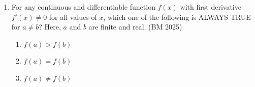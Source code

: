 \begin{enumerate}[label=\thesubsection.\arabic*, ref=\thesubsection.\theenumi]
\begin{center}


\end{center}
\begin{multicols}{4}
\begin{enumerate}
\setlength{\itemsep}{0pt}
    \item $b_1 < 0.5$
    \item $b_2 > 0.5$
    \item $b_2 < b_1 + 0.5$
    \item $b_1+b_2 < 1$
\end{enumerate}
\end{multicols}
\solution
The following code gives whether the triangle is feasible or not by considering $b_1, b_2$.
\begin{lstlisting}
Codes/bm3.py
\end{lstlisting}
\item For any continuous and differentiable function $f(x)$ with
first derivative $f'(x) \neq 0$ for all values of $x$, which one of the
following is ALWAYS TRUE for $a \neq b$?
Here, $a$ and $b$ are finite and real.
\hfill  (BM 2025)
\begin{multicols}{4}
\begin{enumerate}
\setlength{\itemsep}{0pt}
\item $f(a) > f(b)$
\item $f(a) = f(b)$
\item $f(a) \neq f(b)$

\end{enumerate}
\end{multicols}
\end{enumerate}

